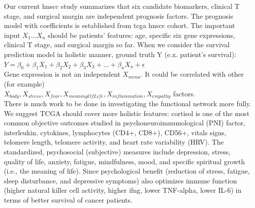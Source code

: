 \documentclass[12pt, a4paper]{article}
\begin{document}
Our current \acrshort{hnscc} study summarizes that six candidate biomarkers, clinical T stage, and surgical margin are independent prognosis factors.
The prognosis model with coefficients is established from \acrshort{tcga} \acrshort{hnscc} cohort. The important input $X_1...X_n$ should be patients' features: age, specific six gene expressions, clinical T stage, and surgical margin so far.
When we consider the survival prediction model in holistic manner,
ground truth Y (e.x. patient's survival):\\[0.5cm]
$Y = \beta_0 + \beta_1 X_1 + \beta_2 X_2 + \beta_3 X_3 + ... + \beta_n X_n + \epsilon$\\[0.5cm]
Gene expression is not an independent $X_{mrna}$. It could be correlated with other (for example)\\ $X_{body}, X_{stress}, X_{fear}, X_{meaningOfLife}, X_{inflammation}, X_{empathy}$ factors.\\
There is much work to be done in investigating the functional network more fully\cite{Rogers1959}.
We suggest TCGA should cover more holistic features:
cortisol is one of the most common objective outcomes studied in psychoneuroimmunological (PNI) factor, interleukin, cytokines, lymphocytes (CD4+, CD8+), CD56+, vitals signs, telomere length, telomere activity, and heart rate variability (HRV).
The standardized, psychosocial (subjective) measures include depression, stress, quality of life, anxiety, fatigue, mindfulness, mood, and specific spiritual growth (i.e., the meaning of life)\cite{Hsiao2012}.
Since psychological benefit (reduction of stress, fatigue, sleep disturbance, and depressive symptoms) also optimizes immune function (higher natural killer cell activity, higher \acrshort{ifng}, lower TNF-alpha, lower IL-6) in terms of better survival of cancer patients.
\end{document}
